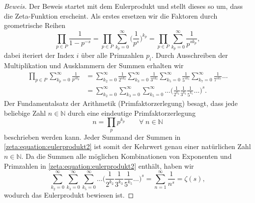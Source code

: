 \begin{proof}[Beweis]
    Der Beweis startet mit dem Eulerprodukt und stellt dieses so um, dass die Zeta-Funktion erscheint.
    Als erstes ersetzen wir die Faktoren durch geometrische Reihen
    \begin{equation}
        \prod_{p\in P}
        \frac{1}{1-p^{-s}}
        =
        \prod_{p \in P}
        \sum_{k_p=0}^{\infty}
        \biggl(
        \frac{1}{p^s}
        \biggr)^{k_p}
        =
        \prod_{p \in P}
        \sum_{k_p=0}^{\infty}
        \frac{1}{p^{s k_p}},
    \end{equation}
    dabei iteriert der Index $i$ über alle Primzahlen $p_i$.
    Durch Ausschreiben der Multiplikation und Ausklammern der Summen erhalten wir
    \begin{align}
        \prod_{p \in P}
        \sum_{k_p=0}^{\infty}
        \frac{1}{p^{s k_p}}
        &=
        \sum_{k_2=0}^{\infty}
        \frac{1}{2^{s k_2}}
        \sum_{k_3=0}^{\infty}
        \frac{1}{3^{s k_3}}
        \sum_{k_5=0}^{\infty}
        \frac{1}{5^{s k_5}}
        \sum_{k_7=0}^{\infty}
        \frac{1}{7^{s k_7}}
        \ldots
        \nonumber \\
        &=
        \sum_{k_2=0}^{\infty}
        \sum_{k_3=0}^{\infty}
        \sum_{k_5=0}^{\infty}
        \ldots
        \biggl(
        \frac{1}{2^{k_2}}
        \frac{1}{3^{k_3}}
        \frac{1}{5^{k_5}}
        \ldots
        \biggr)^s.
        \label{zeta:equation:eulerprodukt2}
    \end{align}
    Der Fundamentalsatz der Arithmetik (Primfaktorzerlegung) besagt, dass jede beliebige Zahl $n \in \mathbb{N}$ durch eine eindeutige Primfaktorzerlegung
    \begin{equation}
        n = \prod_p p^{k_p} \qquad \forall \; n \in \mathbb{N}
    \end{equation}
beschrieben werden kann.
    Jeder Summand der Summen in \eqref{zeta:equation:eulerprodukt2} ist somit der Kehrwert genau einer natürlichen Zahl $n \in \mathbb{N}$.
    Da die Summen alle möglichen Kombinationen von Exponenten und Primzahlen in \eqref{zeta:equation:eulerprodukt2} enthält, haben wir
    \begin{equation}
        \sum_{k_2=0}^{\infty}
        \sum_{k_3=0}^{\infty}
        \sum_{k_5=0}^{\infty}
        \ldots
        \biggl(
        \frac{1}{2^{k_2}}
        \frac{1}{3^{k_3}}
        \frac{1}{5^{k_5}}
        \ldots
        \biggr)^s
        =
        \sum_{n=1}^\infty
        \frac{1}{n^s}
        =
        \zeta(s),
    \end{equation}
    wodurch das Eulerprodukt bewiesen ist.
\end{proof}

